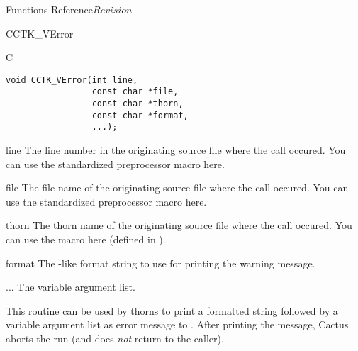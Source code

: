 \begin{cactuspart}{ Functions Reference}{}{$Revision$}
\begin{FunctionDescription}{CCTK\_VError}
\begin{SynopsisSection}
\begin{Synopsis}{C}
\begin{verbatim}
void CCTK_VError(int line,
                 const char *file,
                 const char *thorn,
                 const char *format,
                 ...);
\end{verbatim}
\end{Synopsis}
\end{SynopsisSection}

\begin{ParameterSection}
\begin{Parameter}{line}
The line number in the originating source file where the  call
occured. You can use the standardized  preprocessor macro here.
\end{Parameter}
\begin{Parameter}{file}
The file name of the originating source file where the  call
occured. You can use the standardized  preprocessor macro here.
\end{Parameter}
\begin{Parameter}{thorn}
The thorn name of the originating source file where the  call occured. You can use the  macro here (defined in ).
\end{Parameter}
\begin{Parameter}{format}
The -like format string to use for printing the warning message.
\end{Parameter}
\begin{Parameter}{...}
The variable argument list.
\end{Parameter}
\end{ParameterSection}

\begin{Discussion}
This routine can be used by thorns to print a formatted string
followed by a variable argument list as error message to
. After printing the message, Cactus aborts the run (and
 does \emph{not} return to the caller).
\end{Discussion}


\end{FunctionDescription}
\end{cactuspart}
